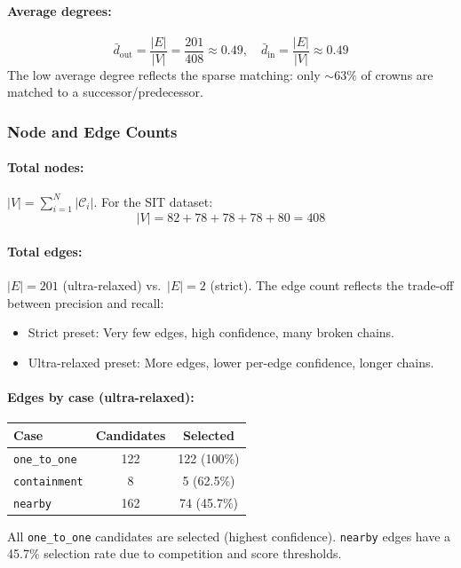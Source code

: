 \paragraph{Average degrees:}
\[
\bar{d}_{\text{out}} = \frac{|E|}{|V|} = \frac{201}{408} \approx 0.49, \quad
\bar{d}_{\text{in}} = \frac{|E|}{|V|} \approx 0.49
\]
The low average degree reflects the sparse matching: only $\sim 63\%$ of crowns are matched to a successor/predecessor.

\subsubsection{Node and Edge Counts}

\paragraph{Total nodes:} $|V| = \sum_{i=1}^N |\mathcal{C}_i|$. For the SIT dataset:
\[
|V| = 82 + 78 + 78 + 78 + 80 = 408
\]

\paragraph{Total edges:} $|E| = 201$ (ultra-relaxed) vs.\ $|E| = 2$ (strict). The edge count reflects the trade-off between precision and recall:
\begin{itemize}
    \item Strict preset: Very few edges, high confidence, many broken chains.
    \item Ultra-relaxed preset: More edges, lower per-edge confidence, longer chains.
\end{itemize}

\paragraph{Edges by case (ultra-relaxed):}
\begin{center}
\begin{tabular}{lcc}
\toprule
Case & Candidates & Selected \\
\midrule
\texttt{one\_to\_one} & 122 & 122 (100\%) \\
\texttt{containment} & 8 & 5 (62.5\%) \\
\texttt{nearby} & 162 & 74 (45.7\%) \\
\bottomrule
\end{tabular}
\end{center}
All \texttt{one\_to\_one} candidates are selected (highest confidence). \texttt{nearby} edges have a 45.7\% selection rate due to competition and score thresholds.

